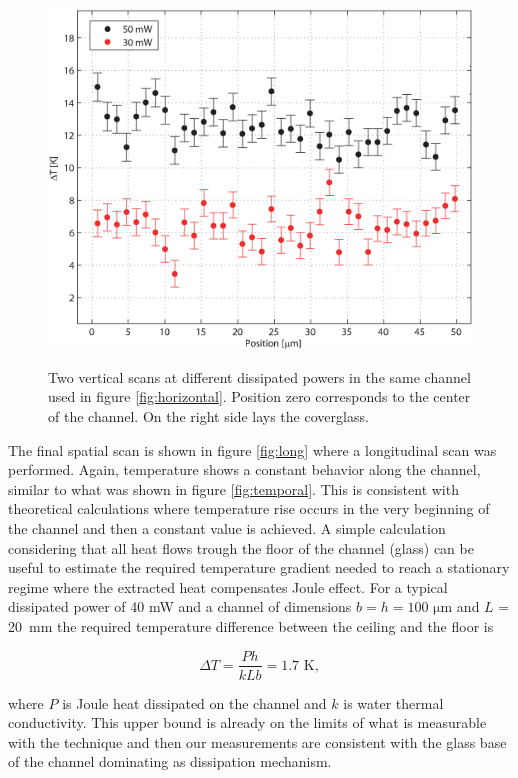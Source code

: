 \documentclass[twocolumn]{svjour3}       %
\begin{document}
\begin{figure}[h!]
\centering
\includegraphics[width=\columnwidth]{figs/vertical.eps}
\label{fig:vertical}
\caption{Two vertical scans at different dissipated powers in the same channel used in figure \ref{fig:horizontal}. Position zero corresponds to the center of the channel. On the right side lays the coverglass.}
\end{figure}

The final spatial scan is shown in figure \ref{fig:long} where a longitudinal scan was performed. Again, temperature shows a constant behavior along the channel, similar to what was shown in figure \ref{fig:temporal}. This is consistent with theoretical calculations \cite{jouleteorico} where temperature rise occurs in the very beginning of the channel and then a constant value is achieved. A simple calculation considering that all heat flows trough the floor of the channel (glass) can be useful to estimate the required temperature gradient needed to reach a stationary regime where the extracted heat compensates Joule effect. For a typical dissipated power of 40 mW and a channel of dimensions $b = h = 100$ $\mathrm{\mu m}$ and $L$ = 20~mm the required temperature difference between the ceiling and the floor is 

\begin{equation}
\Delta T = \frac{Ph}{kLb} = 1.7\,\, \mathrm{K},
\end{equation}

where $P$ is Joule heat dissipated on the channel and $k$ is water thermal conductivity. This upper bound is already on the limits of what is measurable with the technique and then our measurements are consistent with the glass base of the channel dominating as dissipation mechanism. 
\end{document}
